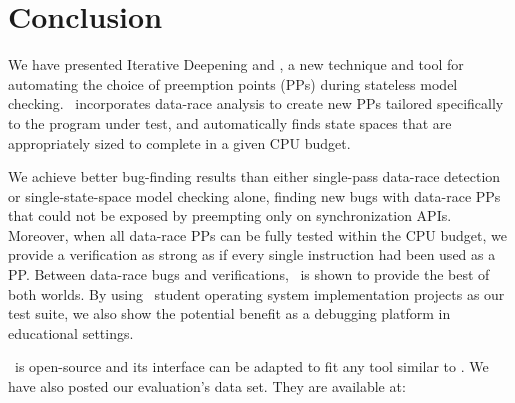 \documentclass[10pt,times,numbers]{sigplanconf}
\begin{document}











\section{Conclusion}
\label{sec:conclusion}


We have presented Iterative Deepening and \quicksand, a new technique and tool for automating the choice of preemption points (PPs) during stateless model checking.
\quicksand~incorporates data-race analysis to create new PPs tailored specifically to the program under test,
and automatically finds state spaces that are appropriately sized to complete in a given CPU budget.

We achieve better bug-finding results than either single-pass data-race detection or single-state-space model checking alone,
finding new bugs with data-race PPs that could not be exposed by preempting only on synchronization APIs.
Moreover, when all data-race PPs can be fully tested within the CPU budget, we provide a verification as strong as if every single instruction had been used as a PP.
Between data-race bugs and verifications, \quicksand~is shown to provide the best of both worlds.
By using \numstudence~student operating system implementation projects as our test suite, we also show the potential benefit as a debugging platform in educational settings.

\quicksand~is open-source and its interface can be adapted to fit any tool similar to \landslide.
We have also posted our evaluation's data set. %
They are available at:
\end{document}

